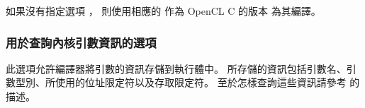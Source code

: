 如果沒有指定選項 ，
則使用相應的  作為 OpenCL C 的版本
為其編譯。

\subsubsection{用於查詢內核引數資訊的選項}

此選項允許編譯器將引數的資訊存儲到執行體中。
所存儲的資訊包括引數名、引數型別、所使用的位址限定符以及存取限定符。
至於怎樣查詢這些資訊請參考  的描述。
\stopclOption
